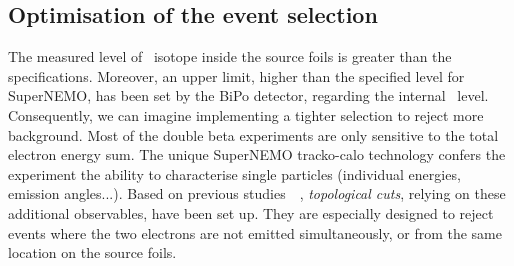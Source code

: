\subsection{Optimisation of the event selection}
\label{subsec:opti_ev_selection}

The measured level of \Tl\ isotope inside the source foils is greater than the specifications.
Moreover, an upper limit, higher than the specified level for SuperNEMO, has been set by the BiPo detector, regarding the internal \Bi\ level.
Consequently, we can imagine implementing a tighter selection to reject more background.
Most of the double beta experiments are only sensitive to the total electron energy sum.
The unique SuperNEMO tracko-calo technology confers the experiment the ability to characterise single particles (individual energies, emission angles...).
Based on previous studies~\cite{CalvezThesis}~\cite{ChaponThesis}, \emph{topological cuts}, relying on these additional observables, have been set up.
They are especially designed to reject events where the two electrons are not emitted simultaneously, or from the same location on the source foils.

